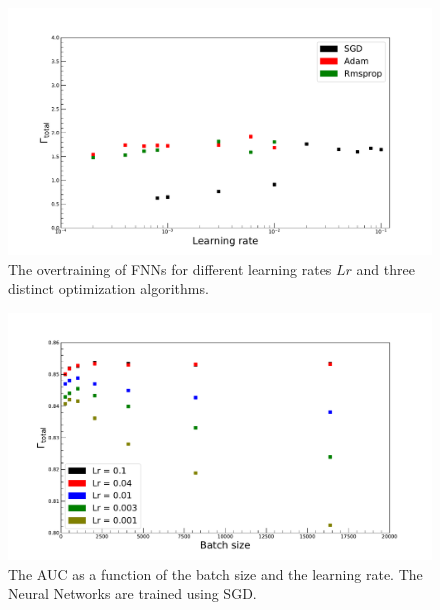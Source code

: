 \begin{figure}[H]
\centering
\includegraphics[width=\linewidth]{figs/FNN/LrOv_Fixed}
\caption{The overtraining of FNNs for different learning rates $Lr$ and three distinct optimization algorithms.}
\label{fig:OvLr}
\end{figure}

\begin{figure}[H]
\centering
\includegraphics[width=\linewidth]{figs/FNN/BatchAuc_SGD}
\caption{The AUC as a function of the batch size and the learning rate. The Neural Networks are trained using SGD.}
\label{fig:SGDBatch}
\end{figure}

